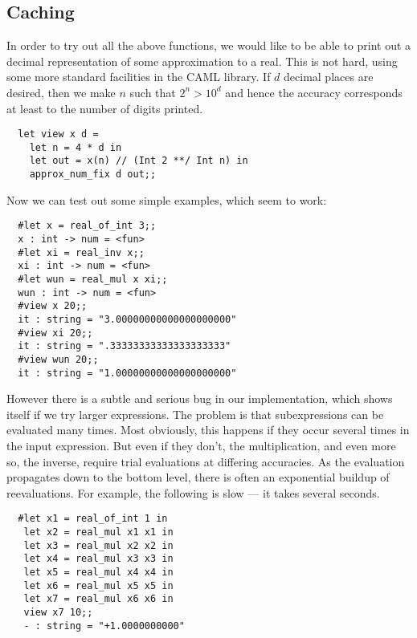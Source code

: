 \subsection{Caching}

In order to try out all the above functions, we would like to be able to print
out a decimal representation of some approximation to a real. This is not hard,
using some more standard facilities in the CAML library. If $d$ decimal places
are desired, then we make $n$ such that $2^n > 10^d$ and hence the accuracy
corresponds at least to the number of digits printed.

\begin{boxed}\begin{lstlisting}
  let view x d =
    let n = 4 * d in
    let out = x(n) // (Int 2 **/ Int n) in
    approx_num_fix d out;;
\end{lstlisting}\end{boxed}

Now we can test out some simple examples, which seem to work:

\begin{boxed}\begin{verbatim}
  #let x = real_of_int 3;;
  x : int -> num = <fun>
  #let xi = real_inv x;;
  xi : int -> num = <fun>
  #let wun = real_mul x xi;;
  wun : int -> num = <fun>
  #view x 20;;
  it : string = "3.00000000000000000000"
  #view xi 20;;
  it : string = ".33333333333333333333"
  #view wun 20;;
  it : string = "1.00000000000000000000"
\end{verbatim}\end{boxed}

However there is a subtle and serious bug in our implementation, which shows
itself if we try larger expressions. The problem is that subexpressions can be
evaluated many times. Most obviously, this happens if they occur several times
in the input expression. But even if they don't, the multiplication, and even
more so, the inverse, require trial evaluations at differing accuracies. As the
evaluation propagates down to the bottom level, there is often an exponential
buildup of reevaluations. For example, the following is slow --- it takes
several seconds.

\begin{boxed}\begin{verbatim}
  #let x1 = real_of_int 1 in
   let x2 = real_mul x1 x1 in
   let x3 = real_mul x2 x2 in
   let x4 = real_mul x3 x3 in
   let x5 = real_mul x4 x4 in
   let x6 = real_mul x5 x5 in
   let x7 = real_mul x6 x6 in
   view x7 10;;
   - : string = "+1.0000000000"
\end{verbatim}\end{boxed}

